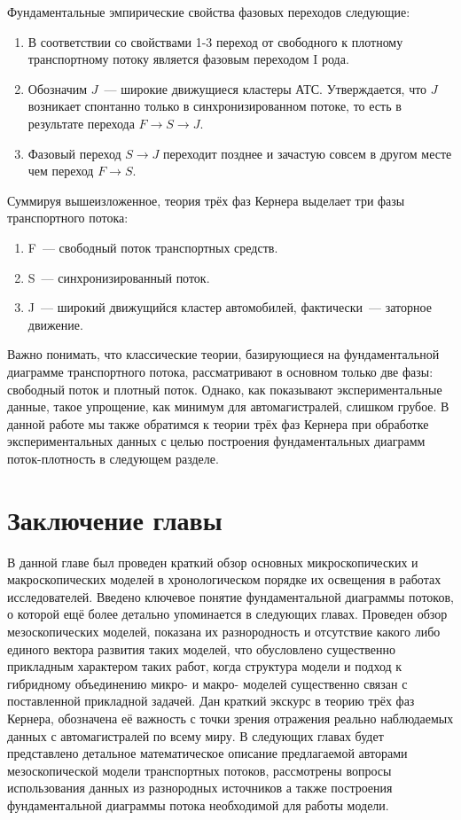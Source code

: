 Фундаментальные эмпирические свойства фазовых переходов следующие:
\begin{enumerate}
  \item В соответствии со свойствами 1-3 переход от свободного к плотному транспортному потоку является фазовым переходом I рода.
  \item Обозначим \(J\)~--- широкие движущиеся кластеры АТС. Утверждается, что \(J\) возникает спонтанно только в синхронизированном потоке, то есть в результате перехода \(F\rightarrow S\rightarrow J\).
  \item Фазовый переход \(S\rightarrow J\) переходит позднее и зачастую совсем в другом месте чем переход \(F\rightarrow S\).
\end{enumerate}

Суммируя вышеизложенное, теория трёх фаз Кернера выделает три фазы транспортного потока:
\begin{enumerate}
  \item F~--- свободный поток транспортных средств.
  \item S~--- синхронизированный поток.
  \item J~--- широкий движущийся кластер автомобилей, фактически~--- заторное движение.
\end{enumerate}
Важно понимать, что классические теории, базирующиеся на фундаментальной диаграмме транспортного потока, рассматривают в основном только две фазы: свободный поток и плотный поток.
Однако, как показывают экспериментальные данные, такое упрощение, как минимум для автомагистралей, слишком грубое.
В данной работе мы также обратимся к теории трёх фаз Кернера при обработке экспериментальных данных с целью построения фундаментальных диаграмм поток-плотность в следующем разделе.


\section{Заключение главы}\label{subsec:ch1/sec5}
В данной главе был проведен краткий обзор основных микроскопических и макроскопических моделей в хронологическом порядке их освещения в работах исследователей.
Введено ключевое понятие фундаментальной диаграммы потоков, о которой ещё более детально упоминается в следующих главах.
Проведен обзор мезоскопических моделей, показана их разнородность и отсутствие какого либо единого вектора развития таких моделей, что обусловлено существенно прикладным характером таких работ, когда структура модели и подход к гибридному объединению микро- и макро- моделей существенно связан с поставленной прикладной задачей.
Дан краткий экскурс в теорию трёх фаз Кернера, обозначена её важность с точки зрения отражения реально наблюдаемых данных с автомагистралей по всему миру.
В следующих главах будет представлено детальное математическое описание предлагаемой авторами мезоскопической модели транспортных потоков, рассмотрены вопросы использования данных из разнородных источников а также построения фундаментальной диаграммы потока необходимой для работы модели.

\FloatBarrier 